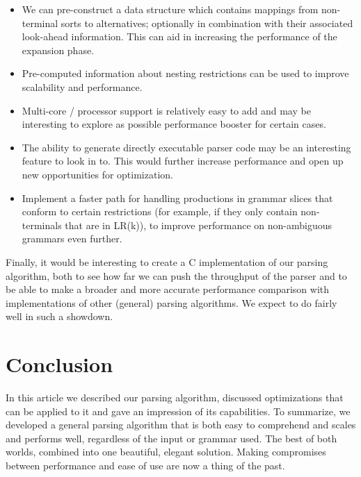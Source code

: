 \documentclass[a4paper,10pt]{article}
\begin{document}
\begin{itemize}
 \setlength{\itemsep}{0pt}
 \setlength{\parskip}{0pt}
 \setlength{\parsep}{0pt}
 
 \item We can pre-construct a data structure which contains mappings from non-terminal sorts to alternatives; optionally in combination with their associated look-ahead information. This can aid in increasing the performance of the expansion phase.
 \item Pre-computed information about nesting restrictions can be used to improve scalability and performance.
 \item Multi-core / processor support is relatively easy to add and may be interesting to explore as possible performance booster for certain cases.
 \item The ability to generate directly executable parser code may be an interesting feature to look in to. This would further increase performance and open up new opportunities for optimization.
 \item Implement a faster path for handling productions in grammar slices that conform to certain restrictions (for example, if they only contain non-terminals that are in LR(k)), to improve performance on non-ambiguous grammars even further.
\end{itemize}

Finally, it would be interesting to create a C implementation of our parsing algorithm, both to see how far we can push the throughput of the parser and to be able to make a broader and more accurate performance comparison with implementations of other (general) parsing algorithms. We expect to do fairly well in such a showdown.

\section{Conclusion}

In this article we described our parsing algorithm, discussed optimizations that can be applied to it and gave an impression of its capabilities. To summarize, we developed a general parsing algorithm that is both easy to comprehend and scales and performs well, regardless of the input or grammar used. The best of both worlds, combined into one beautiful, elegant solution. Making compromises between performance and ease of use are now a thing of the past.



\end{document}
